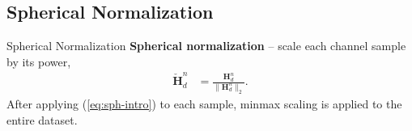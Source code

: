 \documentclass{beamer}
\newcommand{\fignocap}[2]{
	\begin{figure}[!hbtp]
	    \centering
		\texttt{[image: \#2]}
	\end{figure}
}
\begin{document}


\subsection{Spherical Normalization}
  \begin{frame}{Spherical Normalization}
    \textbf{Spherical normalization} -- scale each channel sample by its power,
    \begin{align}
      \mathbf{\check H}_d^n &= \frac{\mathbf H_d^n}{\|\mathbf H_d^n\|_2}. \label{eq:sph-intro}
    \end{align}
    After applying (\ref{eq:sph-intro}) to each sample, minmax scaling is applied to the entire dataset.
  \end{frame}
\end{document}
